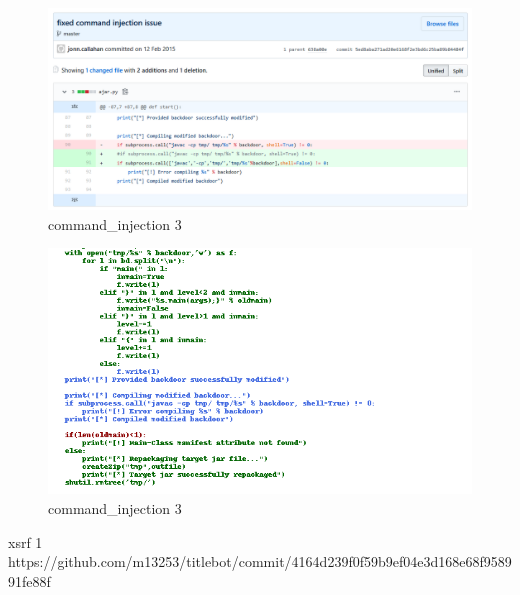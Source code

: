 \documentclass[
a4paper,
pagesize,
pdftex,
12pt,
twoside, %
BCOR=5mm, %
ngerman,
fleqn,
final,
]{scrartcl}
\begin{document}
\begin{figure}[h]
	\centering
	\includegraphics[width=\linewidth]{Images/command_injection3}
	\caption{command\_injection 3}
	\label{fig:command_injection3}
\end{figure}
\begin{figure}[h]
	\centering
	\includegraphics[width=\linewidth]{Images/command_injection3r}
	\caption{command\_injection 3}
	\label{fig:command_injection3r}
\end{figure}



xsrf 1 https://github.com/m13253/titlebot/commit/4164d239f0f59b9ef04e3d168e68f958991fe88f
\end{document}
